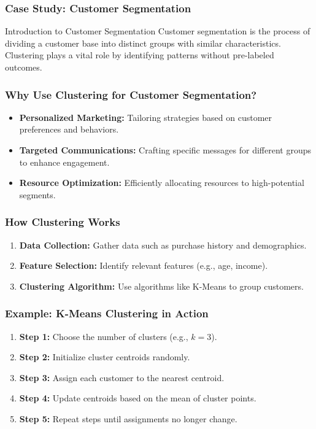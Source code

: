 \documentclass[aspectratio=169]{beamer}
\begin{document}
\begin{frame}[fragile]
    \frametitle{Case Study: Customer Segmentation}
    \begin{block}{Introduction to Customer Segmentation}
        Customer segmentation is the process of dividing a customer base into distinct groups with similar characteristics. Clustering plays a vital role by identifying patterns without pre-labeled outcomes.
    \end{block}
\end{frame}

\begin{frame}[fragile]
    \frametitle{Why Use Clustering for Customer Segmentation?}
    \begin{itemize}
        \item \textbf{Personalized Marketing:} Tailoring strategies based on customer preferences and behaviors.
        \item \textbf{Targeted Communications:} Crafting specific messages for different groups to enhance engagement.
        \item \textbf{Resource Optimization:} Efficiently allocating resources to high-potential segments.
    \end{itemize}
\end{frame}

\begin{frame}[fragile]
    \frametitle{How Clustering Works}
    \begin{enumerate}
        \item \textbf{Data Collection:} Gather data such as purchase history and demographics.
        \item \textbf{Feature Selection:} Identify relevant features (e.g., age, income).
        \item \textbf{Clustering Algorithm:} Use algorithms like K-Means to group customers.
    \end{enumerate}
\end{frame}

\begin{frame}[fragile]
    \frametitle{Example: K-Means Clustering in Action}
    \begin{enumerate}
        \item \textbf{Step 1:} Choose the number of clusters (e.g., \(k = 3\)).
        \item \textbf{Step 2:} Initialize cluster centroids randomly.
        \item \textbf{Step 3:} Assign each customer to the nearest centroid.
        \item \textbf{Step 4:} Update centroids based on the mean of cluster points.
        \item \textbf{Step 5:} Repeat steps until assignments no longer change.
    \end{enumerate}
\end{frame}
\end{document}
